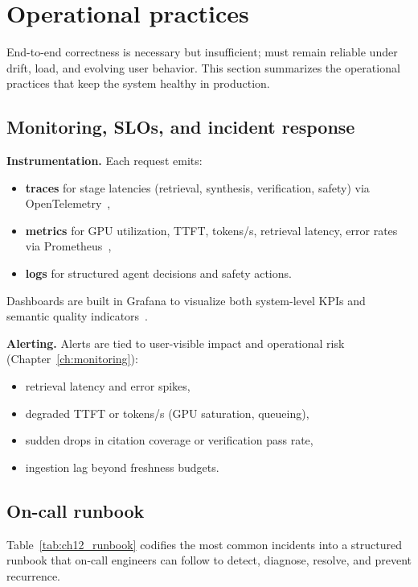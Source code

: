 \section{Operational practices}
\label{sec:ishtar-ops}

End-to-end correctness is necessary but insufficient; \ishtar{} must remain reliable under drift, load, and evolving user behavior.
This section summarizes the operational practices that keep the system healthy in production.

\subsection{Monitoring, SLOs, and incident response}
\label{sec:ishtar-monitoring-ops}

\textbf{Instrumentation.} Each request emits:
\begin{itemize}
    \item \textbf{traces} for stage latencies (retrieval, synthesis, verification, safety) via OpenTelemetry~\cite{otel_spec},
    \item \textbf{metrics} for GPU utilization, TTFT, tokens/s, retrieval latency, error rates via Prometheus~\cite{prometheus},
    \item \textbf{logs} for structured agent decisions and safety actions.
\end{itemize}
Dashboards are built in Grafana to visualize both system-level KPIs and semantic quality indicators~\cite{grafana}.

\textbf{Alerting.} Alerts are tied to user-visible impact and operational risk (Chapter~\ref{ch:monitoring}):
\begin{itemize}
    \item retrieval latency and error spikes,
    \item degraded TTFT or tokens/s (GPU saturation, queueing),
    \item sudden drops in citation coverage or verification pass rate,
    \item ingestion lag beyond freshness budgets.
\end{itemize}

\subsection{On-call runbook}
\label{sec:ishtar-runbook}

Table~\ref{tab:ch12_runbook} codifies the most common \ishtar{} incidents into a structured runbook that on-call engineers can follow to detect, diagnose, resolve, and prevent recurrence.

